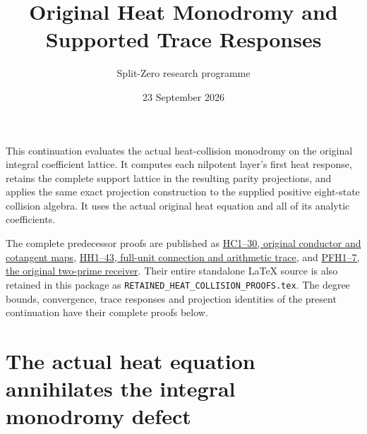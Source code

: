 \documentclass[11pt,a4paper]{article}
\title{Original Heat Monodromy and Supported Trace Responses}
\author{Split-Zero research programme}
\date{23 September 2026}
\theoremstyle{definition}\newtheorem{definition}[theorem]{Definition}
\begin{document}
\maketitle
This continuation evaluates the actual heat-collision monodromy on the
original integral coefficient lattice. It computes each nilpotent
layer's first heat response, retains the complete support lattice in
the resulting parity projections, and applies the same exact
projection construction to the supplied positive eight-state
collision algebra. It uses the actual original heat equation and
all of its analytic coefficients.

The complete predecessor proofs are published as
\href{https://github.com/KokunoYumeto/zeta-function-research-reader/blob/3c022a0adde0a6aa3d8fc8e43ef42795d88e44b0/workbenches/splitzero-tandem/continuations/20260923-supported-zero-collision-holonomy/HEAT_COLLISION_CONDUCTOR.tex}{HC1--30, original conductor and cotangent maps},
\href{https://github.com/KokunoYumeto/zeta-function-research-reader/blob/3c022a0adde0a6aa3d8fc8e43ef42795d88e44b0/workbenches/splitzero-tandem/continuations/20260923-supported-zero-collision-holonomy/HEAT_COLLISION_HOLONOMY.tex}{HH1--43, full-unit connection and arithmetic trace},
and
\href{https://github.com/KokunoYumeto/zeta-function-research-reader/blob/3c022a0adde0a6aa3d8fc8e43ef42795d88e44b0/workbenches/splitzero-tandem/continuations/20260923-supported-zero-collision-holonomy/PRIME_FIXED_SUPPORT_RECEIVER.tex}{PFH1--7, the original two-prime receiver}.
Their entire standalone LaTeX source is also retained in this
package as \texttt{RETAINED\_HEAT\_COLLISION\_PROOFS.tex}.
The degree bounds, convergence, trace responses and projection
identities of the present continuation have their complete proofs below.
\tableofcontents
\clearpage
\section{The actual heat equation annihilates the integral monodromy defect}
\label{sec:hd}
\newcommand{\HD}{\refstepcounter{hd}\par\medskip\noindent\textbf{\thehd.}\ }
\end{document}
